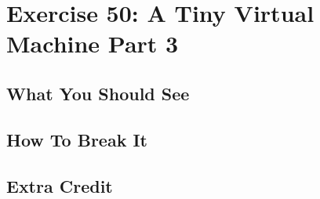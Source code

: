 \chapter{Exercise 50: A Tiny Virtual Machine Part 3}


\section{What You Should See}


\section{How To Break It}


\section{Extra Credit}



